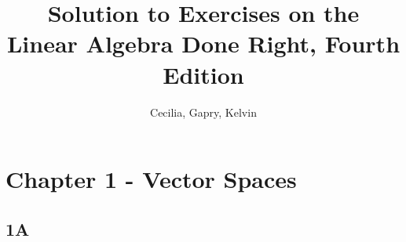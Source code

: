\documentclass{article}
\title{Solution to Exercises on the \\Linear Algebra Done Right, Fourth Edition}
\author{Cecilia, Gapry, Kelvin}
\begin{document}
\maketitle

\section*{Chapter 1 - Vector Spaces}

\subsection*{1A}

\end{document}
